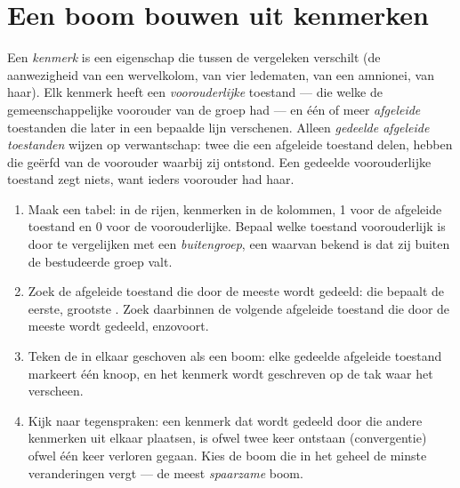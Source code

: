 \section{Een boom bouwen uit kenmerken}

\begin{definition}\label{def:g12:phylogenetic-trees:states}
Een \emph{kenmerk} is een eigenschap die tussen de vergeleken 
verschilt (de aanwezigheid van een wervelkolom, van vier ledematen, van
een amnionei, van haar). Elk kenmerk heeft een \emph{voorouderlijke}
toestand --- die welke de gemeenschappelijke voorouder van de groep had
--- en één of meer \emph{afgeleide} toestanden die later in een bepaalde
lijn verschenen. Alleen \emph{gedeelde afgeleide toestanden} wijzen op
verwantschap: twee  die een afgeleide toestand delen, hebben die
geërfd van de voorouder waarbij zij ontstond. Een gedeelde voorouderlijke
toestand zegt niets, want ieders voorouder had haar.
\end{definition}

\begin{method}\label{met:g12:phylogenetic-trees:build}
\begin{enumerate}
  \item Maak een tabel:  in de rijen, kenmerken in de kolommen, 1
        voor de afgeleide toestand en 0 voor de voorouderlijke. Bepaal
        welke toestand voorouderlijk is door te vergelijken met een
        \emph{buitengroep}, een  waarvan bekend is dat zij buiten de
        bestudeerde groep valt.
  \item Zoek de afgeleide toestand die door de meeste  wordt
        gedeeld: die bepaalt de eerste, grootste . Zoek daarbinnen
        de volgende afgeleide toestand die door de meeste  wordt
        gedeeld, enzovoort.
  \item Teken de in elkaar geschoven  als een boom: elke gedeelde
        afgeleide toestand markeert één knoop, en het kenmerk wordt
        geschreven op de tak waar het verscheen.
  \item Kijk naar tegenspraken: een kenmerk dat wordt gedeeld door
         die andere kenmerken uit elkaar plaatsen, is ofwel twee
        keer ontstaan (convergentie) ofwel één keer verloren gegaan. Kies
        de boom die in het geheel de minste veranderingen vergt --- de
        meest \emph{spaarzame} boom.
\end{enumerate}
\end{method}


